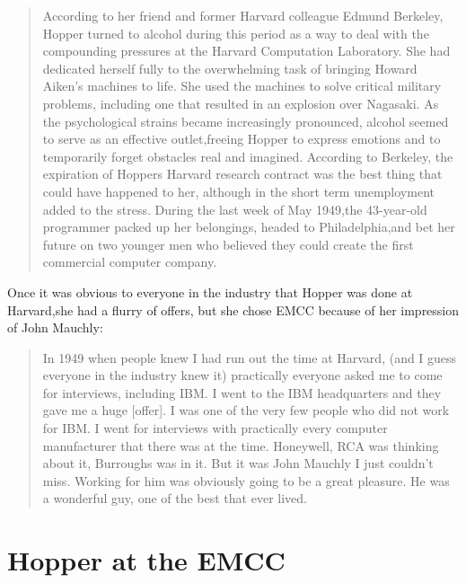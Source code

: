 \begin{quotation}
  According to her friend and former Harvard colleague Edmund
  Berkeley, Hopper turned to alcohol during this period as a way to
  deal with the compounding pressures at the Harvard Computation
  Laboratory. She had dedicated herself fully to the overwhelming task
  of bringing Howard Aiken's machines to life.  She used the machines
  to solve critical military problems, including one that resulted in
  an explosion over Nagasaki. As the psychological strains
  became increasingly pronounced, alcohol seemed to serve as an
  effective outlet,freeing Hopper to express emotions and to
  temporarily forget obstacles real and imagined. According to
  Berkeley, the expiration of Hoppers Harvard research contract was
  the best thing that could have happened to her, although in
  the short term unemployment added to the stress.  During the last
  week of May 1949,the 43-year-old programmer packed up her
  belongings, headed to Philadelphia,and bet her future on two
  younger men who believed they could create the first commercial
  computer company.
  \cite{grace_hopper_and_the_invention_of_the_information_age_2009}
\end{quotation}

Once it was obvious to everyone in the industry that
Hopper was done at Harvard,she had a flurry of offers, but she chose
EMCC because of her impression of John Mauchly:

\begin{quotation}
In 1949 when people knew I had run out the time at
  Harvard, (and I guess everyone in the industry knew it) practically
  everyone asked me to come for interviews, including IBM. I went to
  the IBM headquarters and they gave me a huge [offer].  I was one of
  the very few people who did not work for IBM. I went for interviews
  with practically every computer manufacturer that there was at the
  time. Honeywell, RCA was thinking about it, Burroughs was in it.
  But it was John Mauchly I just couldn't miss. Working for him was
  obviously going to be a great pleasure. He was a wonderful guy, one
  of the best that ever lived.
  \cite{Hopper_1980_Oral_History}
\end{quotation}

\section{Hopper at the EMCC}

